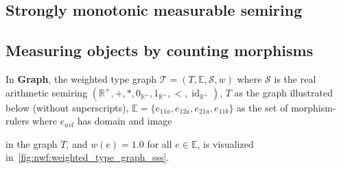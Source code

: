 
\subsection{Strongly monotonic measurable semiring}
\label{sec:strongly_monotonic_measurable_semiring}

\subsection{Measuring objects by counting morphisms}
\begin{example}
    \label{nwf:example:weighted_type_graph}
     In \textbf{Graph}, the weighted type graph $\mathcal{T} = (T, \mathbb{E}, \mathcal{S}, w)$ where $\mathcal{S}$ is the real arithmetic semiring $(\mathbb{R}^+, +, *, 0_{\mathbb{R}^+}, 1_{\mathbb{R}^+}, <, \operatorname{id}_{\mathbb{R}^+})$,
     $T$ as the graph illustrated below (without superscripts), $\mathbb{E}=\{e_{11a},e_{12a},e_{21a},e_{11b}\}$ as the set of morphism-rulers where 
     $e_{uvl}$ has domain 
      and image 
     in the graph $T$,
    and $w(e) = 1.0$ for all $e \in \mathbb{E}$, is visualized in~\autoref{fig:nwf:weighted_type_graph_sss}.
    \begin{figure}[H] 
        \centering
        \caption{}
        \label{fig:nwf:weighted_type_graph_sss}
    \end{figure}
\end{example}

